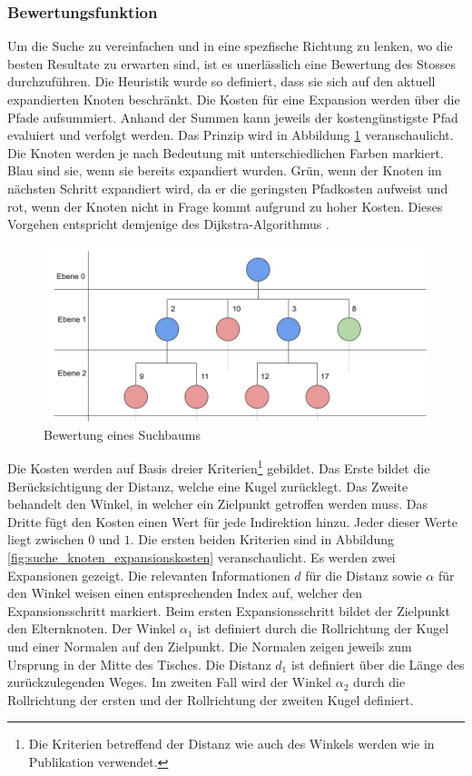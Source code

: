 \subsubsection{Bewertungsfunktion}
Um die Suche zu vereinfachen und in eine spezfische Richtung zu lenken, wo die besten Resultate zu erwarten sind, ist
es unerlässlich eine Bewertung des Stosses durchzuführen. Die Heuristik wurde so definiert, dass sie sich auf den
aktuell expandierten Knoten beschränkt. Die Kosten für eine Expansion werden über die Pfade aufsummiert. Anhand der
Summen kann jeweils der kostengünstigste Pfad evaluiert und verfolgt werden.
Das Prinzip wird in Abbildung \ref{fig:suchbaum_bewertung} veranschaulicht. Die Knoten werden je nach Bedeutung mit
unterschiedlichen Farben markiert. Blau sind sie, wenn sie bereits expandiert wurden. Grün, wenn der Knoten im nächsten
Schritt expandiert wird, da er die geringsten Pfadkosten aufweist und rot, wenn der Knoten nicht in Frage kommt aufgrund
zu hoher Kosten. Dieses Vorgehen entspricht demjenige des Dijkstra-Algorithmus \cite{wiki.dijkstra:1}.
\begin{figure}[h!]
    \begin{center}
        \includegraphics[width=0.8\linewidth]{../common/03_billiard_ai/resources/28_suchbaum_bewertung.png}
    \end{center}
    \caption{Bewertung eines Suchbaums}
    \label{fig:suchbaum_bewertung}
\end{figure}

Die Kosten werden auf Basis dreier Kriterien\footnote{Die Kriterien betreffend der Distanz wie auch des Winkels werden wie
in Publikation \cite{inproceedings:billiard_ai:1} verwendet.} gebildet. Das Erste bildet die Berücksichtigung der Distanz, welche eine
Kugel zurücklegt. Das Zweite behandelt den Winkel, in welcher ein Zielpunkt getroffen werden muss. Das Dritte fügt den
Kosten einen Wert für jede Indirektion hinzu. Jeder dieser Werte liegt zwischen $0$ und $1$.
Die ersten beiden Kriterien sind in Abbildung \ref{fig:suche_knoten_expansionskosten} veranschaulicht.
Es werden zwei Expansionen gezeigt. Die relevanten Informationen $d$ für die Distanz sowie $\alpha$ für den Winkel weisen
einen entsprechenden Index auf, welcher den Expansionsschritt markiert. Beim ersten Expansionsschritt bildet der Zielpunkt
den Elternknoten. Der Winkel $\alpha_1$ ist definiert durch die Rollrichtung der Kugel und einer Normalen auf den Zielpunkt.
Die Normalen zeigen jeweils zum Ursprung in der Mitte des Tisches. Die Distanz $d_1$ ist definiert über die Länge des
zurückzulegenden Weges. Im zweiten Fall wird der Winkel $\alpha_2$ durch die Rollrichtung der ersten und der Rollrichtung
der zweiten Kugel definiert.

